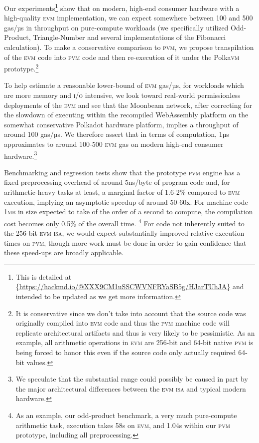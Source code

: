 Our experiments\footnote{This is detailed at \url{{https://hackmd.io/@XXX9CM1uSSCWVNFRYaSB5g/HJarTUhJA}} and intended to be updated as we get more information.} show that on modern, high-end consumer hardware with a high-quality \textsc{evm} implementation, we can expect somewhere between 100 and 500 gas/µs in throughput on pure-compute workloads (we specifically utilized Odd-Product, Triangle-Number and several implementations of the Fibonacci calculation). To make a conservative comparison to \textsc{pvm}, we propose transpilation of the \textsc{evm} code into \textsc{pvm} code and then re-execution of it under the Polka\textsc{vm} prototype.\footnote{It is conservative since we don't take into account that the source code was originally compiled into \textsc{evm} code and thus the \textsc{pvm} machine code will replicate architectural artifacts and thus is very likely to be pessimistic. As an example, all arithmetic operations in \textsc{evm} are 256-bit and 64-bit native \textsc{pvm} is being forced to honor this even if the source code only actually required 64-bit values.}

To help estimate a reasonable lower-bound of \textsc{evm} gas/µs, \eg for workloads which are more memory and \textsc{i/o} intensive, we look toward real-world permissionless deployments of the \textsc{evm} and see that the Moonbeam network, after correcting for the slowdown of executing within the recompiled WebAssembly platform on the somewhat conservative Polkadot hardware platform, implies a throughput of around 100 gas/µs. We therefore assert that in terms of computation, 1µs approximates to around 100-500 \textsc{evm} gas on modern high-end consumer hardware.\footnote{We speculate that the substantial range could possibly be caused in part by the major architectural differences between the \textsc{evm} \textsc{isa} and typical modern hardware.}

Benchmarking and regression tests show that the prototype \textsc{pvm} engine has a fixed preprocessing overhead of around 5ns/byte of program code and, for arithmetic-heavy tasks at least, a marginal factor of 1.6-2\% compared to \textsc{evm} execution, implying an asymptotic speedup of around 50-60x. For machine code 1\textsc{mb} in size expected to take of the order of a second to compute, the compilation cost becomes only 0.5\% of the overall time. \footnote{As an example, our odd-product benchmark, a very much pure-compute arithmetic task, execution takes 58s on \textsc{evm}, and 1.04s within our \textsc{pvm} prototype, including all preprocessing.} For code not inherently suited to the 256-bit \textsc{evm} \textsc{isa}, we would expect substantially improved relative execution times on \textsc{pvm}, though more work must be done in order to gain confidence that these speed-ups are broadly applicable.

